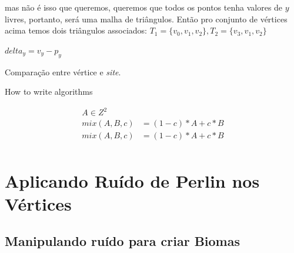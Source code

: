 
mas não é isso que queremos, queremos que todos os pontos tenha valores de $y$
livres, portanto, será uma malha de triângulos. Então pro conjunto de vértices
acima temos dois triângulos associados:
$T_{1} = \{v_{0}, v_{1}, v_{2}\}, T_{2} = \{v_{3}, v_{1}, v_{2}\}$

\begin{algorithm}[H]\label{comp_vertice_site}
  $delta_{y} = v_{y} - p_{y}$ \\
  \caption{Comparação entre vértice e \textit{site}.}
\end{algorithm}

\begin{algorithm}[H] %
 \caption{How to write algorithms}
     \SetAlgoLined


\end{algorithm}


\begin{align}
    A \in Z^{2} \\
    mix(A, B, c) &= (1-c) * A + c*B \\
    mix(A, B, c) &= (1-c) * A + c*B \\
\end{align}






\section{Aplicando Ruído de Perlin nos Vértices}

\subsection{Manipulando ruído para criar Biomas}
